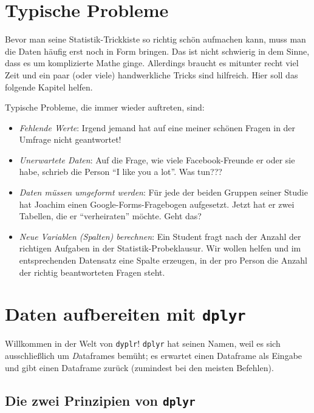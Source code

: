 \documentclass[12pt,ngerman,]{book}
\providecommand{\tightlist}{%
  \setlength{\itemsep}{0pt}\setlength{\parskip}{0pt}}
\begin{document}
\section{Typische Probleme}\label{typische-probleme}

Bevor man seine Statistik-Trickkiste so richtig schön aufmachen kann,
muss man die Daten häufig erst noch in Form bringen. Das ist nicht
schwierig in dem Sinne, dass es um komplizierte Mathe ginge. Allerdings
braucht es mitunter recht viel Zeit und ein paar (oder viele)
handwerkliche Tricks sind hilfreich. Hier soll das folgende Kapitel
helfen.

Typische Probleme, die immer wieder auftreten, sind:

\begin{itemize}
\tightlist
\item
  \emph{Fehlende Werte}: Irgend jemand hat auf eine meiner schönen
  Fragen in der Umfrage nicht geantwortet!
\item
  \emph{Unerwartete Daten}: Auf die Frage, wie viele Facebook-Freunde er
  oder sie habe, schrieb die Person ``I like you a lot''. Was tun???
\item
  \emph{Daten müssen umgeformt werden}: Für jede der beiden Gruppen
  seiner Studie hat Joachim einen Google-Forms-Fragebogen aufgesetzt.
  Jetzt hat er zwei Tabellen, die er ``verheiraten'' möchte. Geht das?
\item
  \emph{Neue Variablen (Spalten) berechnen}: Ein Student fragt nach der
  Anzahl der richtigen Aufgaben in der Statistik-Probeklausur. Wir
  wollen helfen und im entsprechenden Datensatz eine Spalte erzeugen, in
  der pro Person die Anzahl der richtig beantworteten Fragen steht.
\end{itemize}

\section{\texorpdfstring{Daten aufbereiten mit
\texttt{dplyr}}{Daten aufbereiten mit dplyr}}\label{daten-aufbereiten-mit-dplyr}

Willkommen in der Welt von \texttt{dyplr}! \texttt{dplyr} hat seinen
Namen, weil es sich ausschließlich um \emph{D}ataframes bemüht; es
erwartet einen Dataframe als Eingabe und gibt einen Dataframe zurück
(zumindest bei den meisten Befehlen).

\subsection{\texorpdfstring{Die zwei Prinzipien von
\texttt{dplyr}}{Die zwei Prinzipien von dplyr}}\label{die-zwei-prinzipien-von-dplyr}
\end{document}
